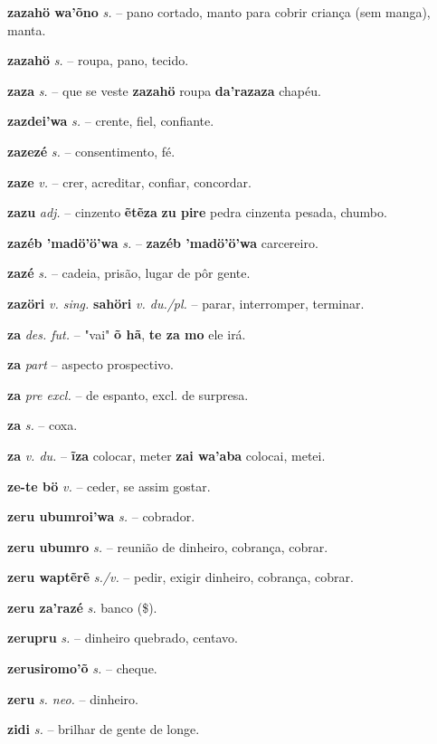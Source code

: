 \textbf{zazahö wa'õno} \textit{s.} -- pano cortado, manto para cobrir criança (sem manga), manta.

\textbf{zazahö} \textit{s.} -- roupa, pano, tecido.

\textbf{zaza} \textit{s.} -- que se veste  \textbf{zazahö} roupa  \textbf{da'razaza} chapéu.

\textbf{zazdei'wa} \textit{s.} -- crente, fiel, confiante.

\textbf{zazezé} \textit{s.} -- consentimento, fé.

\textbf{zaze} \textit{v.} -- crer, acreditar, confiar, concordar.

\textbf{zazu} \textit{adj.} -- cinzento  \textbf{ẽtẽza} \textbf{zu pire} pedra cinzenta pesada, chumbo.

\textbf{zazéb 'madö'ö'wa} \textit{s.} -- \textbf{zazéb 'madö'ö'wa} carcereiro.

\textbf{zazé} \textit{s.} -- cadeia, prisão, lugar de pôr gente.

\textbf{zazöri} \textit{v. sing.} \textbf{sahöri} \textit{v. du./pl.} -- parar, interromper, terminar.

\textbf{za} \textit{des. fut.} -- "vai"  \textbf{õ hã}, \textbf{te za mo} ele irá.

\textbf{za} \textit{part} -- {aspecto prospectivo}.

\textbf{za} \textit{pre excl.} -- de espanto, excl. de surpresa.

\textbf{za} \textit{s.} -- coxa.

\textbf{za} \textit{v. du.} -- \textbf{ĩza} colocar, meter  \textbf{zai wa'aba} colocai, metei.

\textbf{ze-te bö} \textit{v.} -- ceder, se assim gostar.

\textbf{zeru ubumroi'wa} \textit{s.} -- cobrador.

\textbf{zeru ubumro} \textit{s.} -- reunião de dinheiro, cobrança, cobrar.

\textbf{zeru waptẽrẽ} \textit{s./v.} -- pedir, exigir dinheiro, cobrança, cobrar.

\textbf{zeru za'razé} \textit{s.} banco (\$).

\textbf{zerupru} \textit{s.} -- dinheiro quebrado, centavo.

\textbf{zerusiromo'õ} \textit{s.} -- cheque.

\textbf{zeru} \textit{s. neo.} -- dinheiro.

\textbf{zidi} \textit{s.} -- brilhar de gente de longe.

